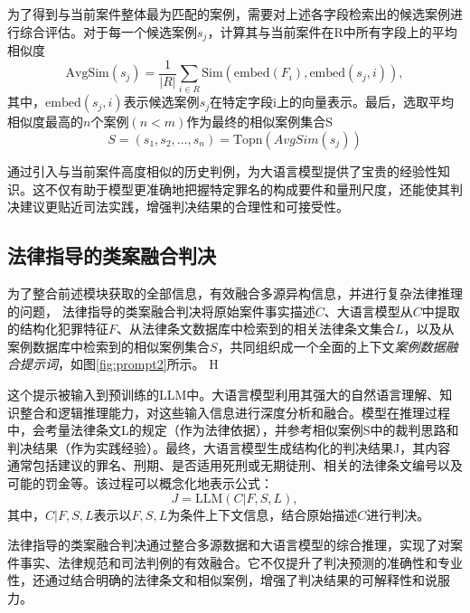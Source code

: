 为了得到与当前案件整体最为匹配的案例，需要对上述各字段检索出的候选案例进行综合评估。对于每一个候选案例$s_j$​，计算其与当前案件在R中所有字段上的平均相似度
{
\small
\begin{equation}
    \text{AvgSim}(s_j) = \frac{1}{|R|} \sum_{i \in R} \text{Sim}\left( \text{embed}(F_i), \text{embed}(s_j, i) \right),
\end{equation}
}
其中，$\text{embed}(s_j,i)$表示候选案例$s_j$​在特定字段$\text{i}$上的向量表示。最后，选取平均相似度最高的$n$个案例$(n<m)$作为最终的相似案例集合S
\begin{equation}
	S=(s_1​,s_2​,\dots,s_n​)=\text{Topn​}(AvgSim(s_j​))
\end{equation}

通过引入与当前案件高度相似的历史判例，为大语言模型提供了宝贵的经验性知识。这不仅有助于模型更准确地把握特定罪名的构成要件和量刑尺度，还能使其判决建议更贴近司法实践，增强判决结果的合理性和可接受性。

\subsection{\heiti 法律指导的类案融合判决}

为了整合前述模块获取的全部信息，有效融合多源异构信息，并进行复杂法律推理的问题， 法律指导的类案融合判决将原始案件事实描述$C$、大语言模型从$C$中提取的结构化犯罪特征$F$、从法律条文数据库中检索到的相关法律条文集合$L$，以及从案例数据库中检索到的相似案例集合$S$，共同组织成一个全面的上下文\textit{案例数据融合提示词}，如图\ref{fig:prompt2}所示。
H


这个提示被输入到预训练的LLM中。大语言模型利用其强大的自然语言理解、知识整合和逻辑推理能力，对这些输入信息进行深度分析和融合。模型在推理过程中，会考量法律条文L的规定（作为法律依据），并参考相似案例S中的裁判思路和判决结果（作为实践经验）。最终，大语言模型生成结构化的判决结果J，其内容通常包括建议的罪名、刑期、是否适用死刑或无期徒刑、相关的法律条文编号以及可能的罚金等。该过程可以概念化地表示公式：
\begin{equation}
	J=\text{LLM}(C|F,S,L),
\end{equation}
其中，$C | F,S,L $表示以$F,S,L$为条件上下文信息，结合原始描述$C$进行判决。

法律指导的类案融合判决通过整合多源数据和大语言模型的综合推理，实现了对案件事实、法律规范和司法判例的有效融合。它不仅提升了判决预测的准确性和专业性，还通过结合明确的法律条文和相似案例，增强了判决结果的可解释性和说服力。
